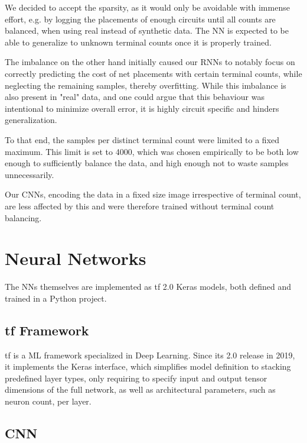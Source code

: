 We decided to accept the sparsity, as it would only be avoidable with immense effort, e.g. by logging the placements of enough circuits until all counts are balanced, when using real instead of synthetic data. The \gls{NN} is expected to be able to generalize to unknown terminal counts once it is properly trained.

The imbalance on the other hand initially caused our \glspl{RNN} to notably focus on correctly predicting the cost of net placements with certain terminal counts, while neglecting the remaining samples, thereby overfitting. While this imbalance is also present in "real" data, and one could argue that this behaviour was intentional to minimize overall error, it is highly circuit specific and hinders generalization.

To that end, the samples per distinct terminal count were limited to a fixed maximum. This limit is set to 4000, which was chosen empirically to be both low enough to sufficiently balance the data, and high enough not to waste samples unnecessarily.

Our \glspl{CNN}, encoding the data in a fixed size image irrespective of terminal count, are less affected by this and were therefore trained without terminal count balancing.

\section{Neural Networks}

The \glspl{NN} themselves are implemented as \gls{tf} 2.0 Keras models, both defined and trained in a Python project.

\subsection{\gls{tf} Framework}

\gls{tf} is a \gls{ML} framework specialized in Deep Learning.\cite{tensorflow2015-whitepaper} Since its 2.0 release in 2019, it implements the Keras interface\cite{chollet2015keras}, which simplifies model definition to stacking predefined layer types, only requiring to specify input and output tensor dimensions of the full network, as well as architectural parameters, such as neuron count, per layer.

\subsection{\gls{CNN}}

